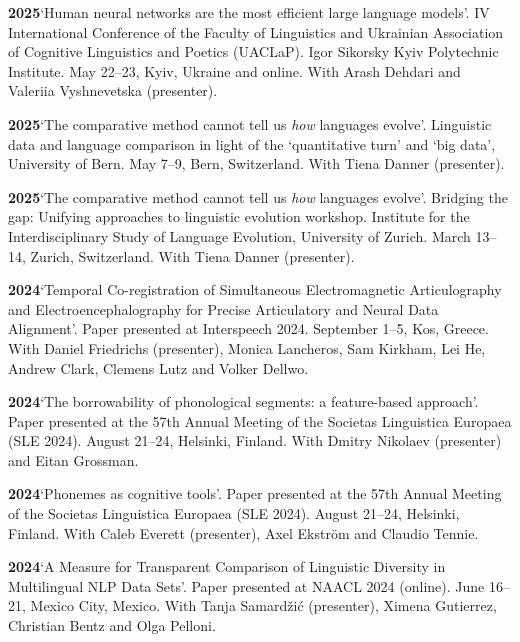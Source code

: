 \documentclass[11pt]{article}
\newcommand{\hangpara}{
 \setlength{\parindent}{0in} %
 \hangindent=0.42in %
}
\begin{document}
\hangpara
\vskip 6pt
{\bf 2025}\hspace{1ex}`Human neural networks are the most efficient large language models'. IV International Conference of the Faculty of Linguistics and Ukrainian Association of Cognitive Linguistics and Poetics (UACLaP). Igor Sikorsky Kyiv Polytechnic Institute. May 22--23, Kyiv, Ukraine and online. With Arash Dehdari and Valeriia Vyshnevetska (presenter). 

\hangpara
\vskip 6pt
{\bf 2025}\hspace{1ex}`The comparative method cannot tell us \textit{how} languages evolve'. Linguistic data and language comparison in light of the `quantitative turn' and `big data', University of Bern. May 7--9, Bern, Switzerland. With Tiena Danner (presenter).

\hangpara
\vskip 6pt
{\bf 2025}\hspace{1ex}`The comparative method cannot tell us \textit{how} languages evolve'. Bridging the gap: Unifying approaches to linguistic evolution workshop. Institute for the Interdisciplinary Study of Language Evolution, University of Zurich. March 13--14, Zurich, Switzerland. With Tiena Danner (presenter).

\hangpara
\vskip 6pt
{\bf 2024}\hspace{1ex}`Temporal Co-registration of Simultaneous Electromagnetic Articulography and Electroencephalography for Precise Articulatory and Neural Data Alignment'. Paper presented at Interspeech 2024. September 1--5, Kos, Greece. With Daniel Friedrichs (presenter), Monica Lancheros, Sam Kirkham, Lei He, Andrew Clark, Clemens Lutz and Volker Dellwo.

\hangpara
\vskip 6pt
{\bf 2024}\hspace{1ex}`The borrowability of phonological segments: a feature-based approach'. Paper presented at the 57th Annual Meeting of the Societas Linguistica Europaea (SLE 2024). August 21--24, Helsinki, Finland. With Dmitry Nikolaev (presenter) and Eitan Grossman. %

\hangpara
\vskip 6pt
{\bf 2024}\hspace{1ex}`Phonemes as cognitive tools'. Paper presented at the 57th Annual Meeting of the Societas Linguistica Europaea (SLE 2024). August 21--24, Helsinki, Finland. With Caleb Everett (presenter), Axel Ekström and Claudio Tennie. %

\vskip 6pt
\hangpara
{\bf 2024}\hspace{1ex}`A Measure for Transparent Comparison of Linguistic Diversity in Multilingual NLP Data Sets'. Paper presented at NAACL 2024 (online). June 16--21, Mexico City, Mexico. With Tanja Samardžić (presenter), Ximena Gutierrez, Christian Bentz and Olga Pelloni. 
\end{document}

